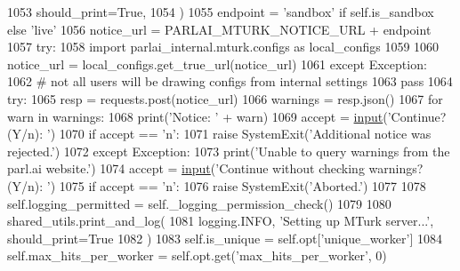 \begin{DoxyCode}
{{{1053                 should\_print=\textcolor{keyword}{True},
1054             )
1055             endpoint = \textcolor{stringliteral}{'sandbox'} \textcolor{keywordflow}{if} self.is\_sandbox \textcolor{keywordflow}{else} \textcolor{stringliteral}{'live'}
1056             notice\_url = PARLAI\_MTURK\_NOTICE\_URL + endpoint
1057             \textcolor{keywordflow}{try}:
1058                 \textcolor{keyword}{import} parlai\_internal.mturk.configs \textcolor{keyword}{as} local\_configs
1059 
1060                 notice\_url = local\_configs.get\_true\_url(notice\_url)
1061             \textcolor{keywordflow}{except} Exception:
1062                 \textcolor{comment}{# not all users will be drawing configs from internal settings}
1063                 \textcolor{keywordflow}{pass}
1064             \textcolor{keywordflow}{try}:
1065                 resp = requests.post(notice\_url)
1066                 warnings = resp.json()
1067                 \textcolor{keywordflow}{for} warn \textcolor{keywordflow}{in} warnings:
1068                     print(\textcolor{stringliteral}{'Notice: '} + warn)
1069                     accept = \hyperlink{namespaceparlai_1_1mturk_1_1core_1_1dev_1_1test_1_1test__full__system_a1e1817cd65688fb90f827834d1fb4567}{input}(\textcolor{stringliteral}{'Continue? (Y/n): '})
1070                     \textcolor{keywordflow}{if} accept == \textcolor{stringliteral}{'n'}:
1071                         \textcolor{keywordflow}{raise} SystemExit(\textcolor{stringliteral}{'Additional notice was rejected.'})
1072             \textcolor{keywordflow}{except} Exception:
1073                 print(\textcolor{stringliteral}{'Unable to query warnings from the parl.ai website.'})
1074                 accept = \hyperlink{namespaceparlai_1_1mturk_1_1core_1_1dev_1_1test_1_1test__full__system_a1e1817cd65688fb90f827834d1fb4567}{input}(\textcolor{stringliteral}{'Continue without checking warnings? (Y/n): '})
1075                 \textcolor{keywordflow}{if} accept == \textcolor{stringliteral}{'n'}:
1076                     \textcolor{keywordflow}{raise} SystemExit(\textcolor{stringliteral}{'Aborted.'})
1077 
1078         self.logging\_permitted = self.\_logging\_permission\_check()
1079 
1080         shared\_utils.print\_and\_log(
1081             logging.INFO, \textcolor{stringliteral}{'Setting up MTurk server...'}, should\_print=\textcolor{keyword}{True}
1082         )
1083         self.is\_unique = self.opt[\textcolor{stringliteral}{'unique\_worker'}]
1084         self.max\_hits\_per\_worker = self.opt.get(\textcolor{stringliteral}{'max\_hits\_per\_worker'}, 0)
}}}
\end{DoxyCode}

